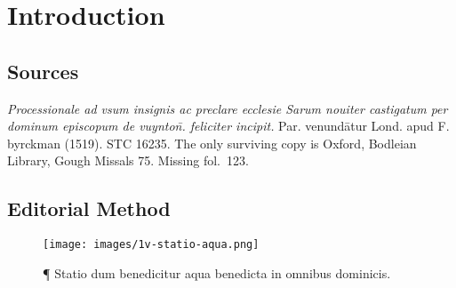 \chapter{Introduction}

\section{Sources}

\textit{Processionale ad vsum insignis ac preclare ecclesie Sarum nouiter castigatum per dominum episcopum de vuynton̄. feliciter incipit.} Par. venundātur Lond. apud F. byrckman (1519). STC 16235. The only surviving copy is Oxford, Bodleian Library, Gough Missals 75. Missing fol.~123.

\section{Editorial Method}

\clearpage

\begin{figure}
\thispagestyle{empty}  
\centering
\texttt{[image: images/1v-statio-aqua.png]}
\caption{¶ Statio dum benedicitur aqua benedicta in omnibus dominicis.}
\end{figure}
